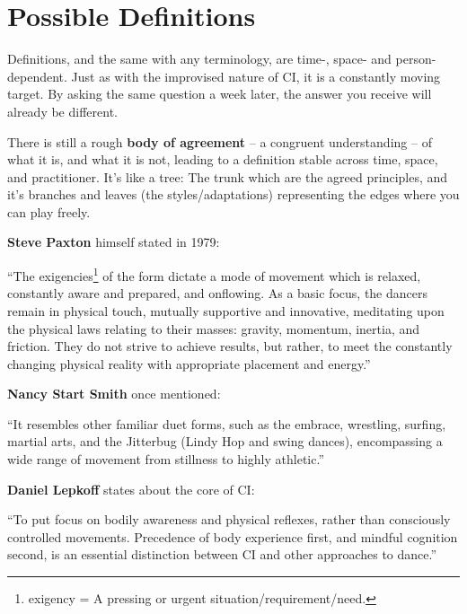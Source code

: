 \section{Possible Definitions}\label{sec:possible-definitions}

Definitions, and the same with any terminology, are time-, space- and person-dependent.
Just as with the improvised nature of CI, it is a constantly moving target.
By asking the same question a week later, the answer you receive will already be different.

There is still a rough \textbf{body of agreement} -- a congruent understanding -- of what it is, and what it is not, leading to a definition stable across time, space, and practitioner.
It's like a tree: The trunk which are the agreed principles, and it's branches and leaves (the styles/adaptations) representing the edges where you can play freely.

\textbf{Steve Paxton} himself stated in 1979:
\begin{displayquote}
	``The exigencies\footnote{exigency = A pressing or urgent situation/requirement/need.} of the form dictate a mode of movement which is relaxed, constantly aware and prepared, and onflowing.
	As a basic focus, the dancers remain in physical touch, mutually supportive and innovative, meditating upon the physical laws relating to their masses: gravity, momentum, inertia, and friction.
	They do not strive to achieve results, but rather, to meet the constantly changing physical reality with appropriate placement and energy.''
\end{displayquote}

\textbf{Nancy Start Smith} once mentioned:
\begin{displayquote}
	``It resembles other familiar duet forms, such as the embrace, wrestling, surfing, martial arts, and the Jitterbug (Lindy Hop and swing dances), encompassing a wide range of movement from stillness to highly athletic.''
\end{displayquote}

\textbf{Daniel Lepkoff} states about the core of CI:
\begin{displayquote}
	``To put focus on bodily awareness and physical reflexes, rather than consciously controlled movements.
	Precedence of body experience first, and mindful cognition second, is an essential distinction between CI and other approaches to dance.''
\end{displayquote}

